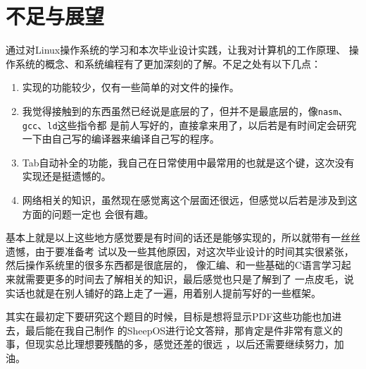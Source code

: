 \chapter{不足与展望}
通过对Linux操作系统的学习和本次毕业设计实践，让我对计算机的工作原理、
操作系统的概念、和系统编程有了更加深刻的了解。不足之处有以下几点：
\begin{enumerate}
\item 实现的功能较少，仅有一些简单的对文件的操作。
\item 我觉得接触到的东西虽然已经说是底层的了，但并不是最底层的，像\texttt{nasm}、\texttt{gcc}、\texttt{ld}这些指令都
  是前人写好的，直接拿来用了，以后若是有时间定会研究一下由自己写的编译器来编译自己写的程序。
\item Tab自动补全的功能，我自己在日常使用中最常用的也就是这个键，这次没有实现还是挺遗憾的。
\item 网络相关的知识，虽然现在感觉离这个层面还很远，但感觉以后若是涉及到这方面的问题一定也
  会很有趣。
\end{enumerate}

基本上就是以上这些地方感觉要是有时间的话还是能够实现的，所以就带有一丝丝遗憾，由于要准备考
试以及一些其他原因，对这次毕业设计的时间其实很紧张，然后操作系统里的很多东西都是很底层的，
像汇编、和一些基础的C语言\cite{HD2008}学习起来就需要更多的时间去了解相关的知识，最后感觉也只是了解到了
一点皮毛，说实话也就是在别人铺好的路上走了一遍，用着别人提前写好的一些框架。

其实在最初定下要研究这个题目的时候，目标是想将显示PDF这些功能也加进去，最后能在我自己制作
的SheepOS进行论文答辩，那肯定是件非常有意义的事，但现实总比理想要残酷的多，感觉还差的很远
，以后还需要继续努力，加油。

